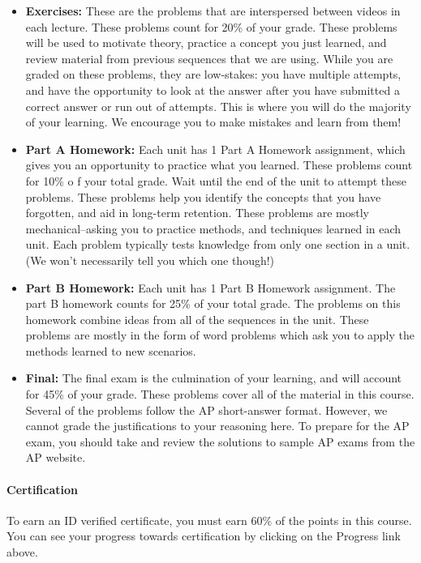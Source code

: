 \documentclass[pdftex, brazil, 12pt, twoside]{article}
\begin{document}
\begin{itemize}
\item \textbf{Exercises:} These are the problems that are interspersed between videos
  in each lecture. These problems count for 20\% of your grade. These problems will
  be used to motivate theory, practice a concept you just learned, and review material
  from previous sequences that we are using. While you are graded on these problems,
  they are low-stakes: you have multiple attempts, and have the opportunity to look
  at the answer after you have submitted a correct answer or run out of attempts.
  This is where you will do the majority of your learning. We encourage you to make
  mistakes and learn from them!
\item \textbf{Part A Homework:} Each unit has 1 Part A Homework assignment, which
  gives you an opportunity to practice what you learned. These problems count for 10\% o
  f your total grade. Wait until the end of the unit to attempt these problems.
  These problems help you identify the concepts that you have forgotten, and aid in
  long-term retention. These problems are mostly mechanical–asking you to practice
  methods, and techniques learned in each unit. Each problem typically tests knowledge
  from only one section in a unit. (We won't necessarily tell you which one though!)
\item \textbf{Part B Homework:} Each unit has 1 Part B Homework assignment. The part
  B homework counts for 25\% of your total grade. The problems on this homework
  combine ideas from all of the sequences in the unit. These problems are mostly in
  the form of word problems which ask you to apply the methods learned to new scenarios.
\item \textbf{Final:} The final exam is the culmination of your learning, and will
  account for 45\% of your grade. These problems cover all of the material in this course.
  Several of the problems follow the AP short-answer format. However, we cannot grade
  the justifications to your reasoning here. To prepare for the AP exam, you should
  take and review the solutions to sample AP exams from the AP website. 
\end{itemize}

\paragraph{Certification} To earn an ID verified certificate, you must earn 60\% of
the points in this course. You can see your progress towards certification by clicking
on the Progress link above.
\end{document}
